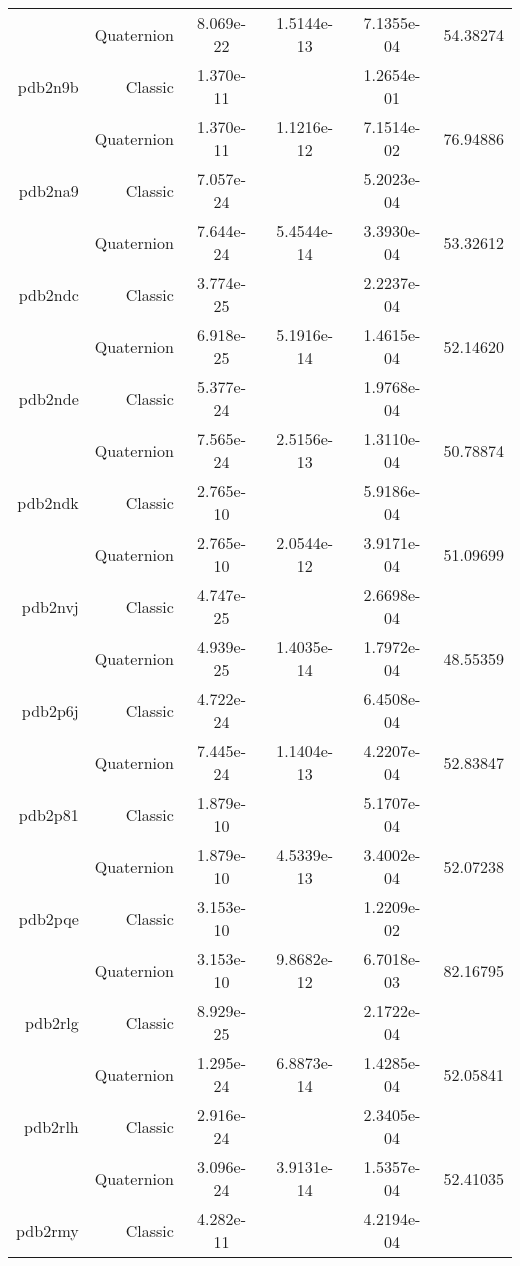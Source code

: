 \begin{xltabular}{\textwidth}{r|rS[table-format=1.3e+2]S[table-format=1.4e+2]S[table-format=1.4e+2]S[table-format=-1.5]}
& Quaternion & 8.069e-22 & 1.5144e-13 & 7.1355e-04 & 54.38274\\  \addlinespace
pdb2n9b & Classic & 1.370e-11 &  & 1.2654e-01 & \\
& Quaternion & 1.370e-11 & 1.1216e-12 & 7.1514e-02 & 76.94886\\  \addlinespace
pdb2na9 & Classic & 7.057e-24 &  & 5.2023e-04 & \\
& Quaternion & 7.644e-24 & 5.4544e-14 & 3.3930e-04 & 53.32612\\  \addlinespace
pdb2ndc & Classic & 3.774e-25 &  & 2.2237e-04 & \\
& Quaternion & 6.918e-25 & 5.1916e-14 & 1.4615e-04 & 52.14620\\  \addlinespace
pdb2nde & Classic & 5.377e-24 &  & 1.9768e-04 & \\
& Quaternion & 7.565e-24 & 2.5156e-13 & 1.3110e-04 & 50.78874\\  \addlinespace
pdb2ndk & Classic & 2.765e-10 &  & 5.9186e-04 & \\
& Quaternion & 2.765e-10 & 2.0544e-12 & 3.9171e-04 & 51.09699\\  \addlinespace
pdb2nvj & Classic & 4.747e-25 &  & 2.6698e-04 & \\
& Quaternion & 4.939e-25 & 1.4035e-14 & 1.7972e-04 & 48.55359\\  \addlinespace
pdb2p6j & Classic & 4.722e-24 &  & 6.4508e-04 & \\
& Quaternion & 7.445e-24 & 1.1404e-13 & 4.2207e-04 & 52.83847\\  \addlinespace
pdb2p81 & Classic & 1.879e-10 &  & 5.1707e-04 & \\
& Quaternion & 1.879e-10 & 4.5339e-13 & 3.4002e-04 & 52.07238\\  \addlinespace
pdb2pqe & Classic & 3.153e-10 &  & 1.2209e-02 & \\
& Quaternion & 3.153e-10 & 9.8682e-12 & 6.7018e-03 & 82.16795\\  \addlinespace
pdb2rlg & Classic & 8.929e-25 &  & 2.1722e-04 & \\
& Quaternion & 1.295e-24 & 6.8873e-14 & 1.4285e-04 & 52.05841\\  \addlinespace
pdb2rlh & Classic & 2.916e-24 &  & 2.3405e-04 & \\
& Quaternion & 3.096e-24 & 3.9131e-14 & 1.5357e-04 & 52.41035\\  \addlinespace
pdb2rmy & Classic & 4.282e-11 &  & 4.2194e-04 & \\

\end{xltabular}
